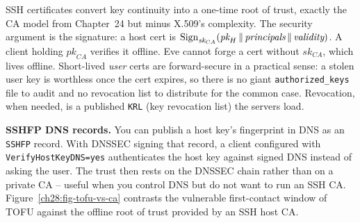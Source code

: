 \begin{whybox}
SSH certificates convert key continuity into a one-time root of trust, exactly the CA model from Chapter~24 but minus X.509's complexity. The security argument is the signature: a host cert is $\operatorname{Sign}_{\textit{sk}_{CA}}(\textit{pk}_H \,\|\, \textit{principals} \,\|\, \textit{validity})$. A client holding $\textit{pk}_{CA}$ verifies it offline. Eve cannot forge a cert without $\textit{sk}_{CA}$, which lives offline. Short-lived \emph{user} certs are forward-secure in a practical sense: a stolen user key is worthless once the cert expires, so there is no giant \texttt{authorized\_keys} file to audit and no revocation list to distribute for the common case. Revocation, when needed, is a published \texttt{KRL} (key revocation list) the servers load.
\end{whybox}

\textbf{SSHFP DNS records.} You can publish a host key's fingerprint in DNS as an \texttt{SSHFP} record. With DNSSEC signing that record, a client configured with \texttt{VerifyHostKeyDNS=yes} authenticates the host key against signed DNS instead of asking the user. The trust then rests on the DNSSEC chain rather than on a private CA -- useful when you control DNS but do not want to run an SSH CA. Figure~\ref{ch28:fig-tofu-vs-ca} contrasts the vulnerable first-contact window of TOFU against the offline root of trust provided by an SSH host CA.

